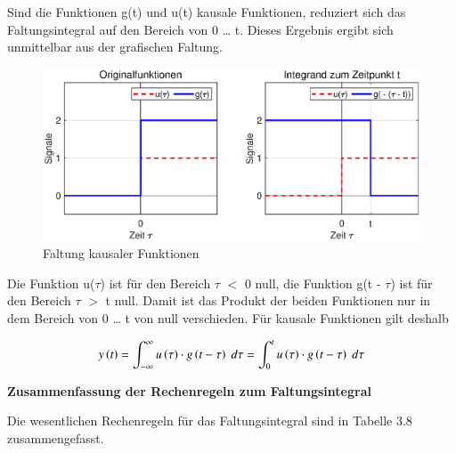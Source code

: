 \noindent Sind die Funktionen g(t) und u(t) kausale Funktionen, reduziert sich das Faltungsintegral auf den Bereich von 0 … t. Dieses Ergebnis ergibt sich unmittelbar aus der grafischen Faltung. 

\begin{figure}[H]
  \centerline{\includegraphics[width=1\textwidth]{Kapitel2/Bilder/image22}}
  \caption{Faltung kausaler Funktionen}
  \label{fig:FaltungKausal}
\end{figure}

\noindent Die Funktion u($\tau$) ist f\"{u}r den Bereich $\tau$ $\mathrm{<}$ 0 null, die Funktion g(t - $\tau$) ist f\"{u}r den Bereich $\tau$ $\mathrm{>}$ t null. Damit ist das Produkt der beiden Funktionen nur in dem Bereich von 0 {\dots} t von null verschieden. F\"{u}r kausale Funktionen gilt deshalb

\begin{equation}\label{eq:threehundredseventythree}
y\left(t\right)=\int _{-\infty }^{\infty }u\left(\tau \right)\cdot g\left(t-\tau \right){\rm \; }d\tau  =\int _{0}^{t}u\left(\tau \right)\cdot g\left(t-\tau \right){\rm \; }d\tau 
\end{equation}

\clearpage

{\selectfont
\noindent\textbf{Zusammenfassung der Rechenregeln zum Faltungsintegral}}

\noindent Die wesentlichen Rechenregeln für das Faltungsintegral sind in Tabelle 3.8 zusammengefasst.


